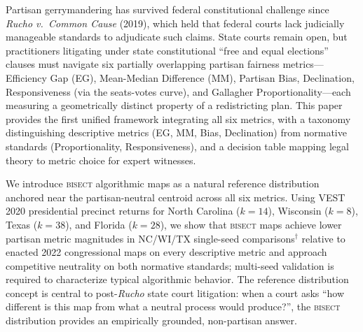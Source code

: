 Partisan gerrymandering has survived federal constitutional challenge since \textit{Rucho v.\ Common Cause}
(2019), which held that federal courts lack judicially manageable standards to adjudicate such claims.
State courts remain open, but practitioners litigating under state constitutional ``free and equal elections''
clauses must navigate six partially overlapping partisan fairness metrics---Efficiency Gap (EG),
Mean-Median Difference (MM), Partisan Bias, Declination, Responsiveness (via the seats-votes curve),
and Gallagher Proportionality---each measuring a geometrically distinct property of a redistricting plan.
This paper provides the first unified framework integrating all six metrics, with a taxonomy
distinguishing descriptive metrics (EG, MM, Bias, Declination) from normative standards
(Proportionality, Responsiveness), and a decision table mapping legal theory to metric choice
for expert witnesses.

We introduce \textsc{bisect} algorithmic maps as a natural reference distribution anchored near
the partisan-neutral centroid across all six metrics. Using VEST 2020 presidential precinct returns
for North Carolina ($k=14$), Wisconsin ($k=8$), Texas ($k=38$), and Florida ($k=28$), we show
that \textsc{bisect} maps achieve lower partisan metric magnitudes in NC/WI/TX
single-seed comparisons$^\dagger$ relative to enacted 2022 congressional maps on every
descriptive metric and approach competitive neutrality on both normative standards;
multi-seed validation is required to characterize typical algorithmic behavior.
The reference distribution concept is central to post-\textit{Rucho} state court litigation:
when a court asks ``how different is this map from what a neutral process would produce?'',
the \textsc{bisect} distribution provides an empirically grounded, non-partisan answer.
